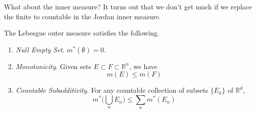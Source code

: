  What about the inner measure? It turns out that we don't get much if we replace the finite to countable in the Jordan inner measure. 

  \begin{lemma}
    The Lebesgue outer measure satisfies the following. 
    \begin{enumerate}
      \item \textit{Null Empty Set}. $m^\ast(\emptyset) = 0$. 
      \item \textit{Monotonicity}. Given sets $E \subset F \subset \mathbb{R}^n$, we have 
      \begin{equation}
        m(E) \leq m(F)
      \end{equation}
    \item \textit{Countable Subadditivity}. For any countable collection of subsets $\{E_k\}$ of $\mathbb{R}^d$, 
      \begin{equation}
        m^\ast \bigg( \bigcup_n E_n \bigg) \leq \sum_{n} m^\ast (E_n) 
      \end{equation}
    \end{enumerate}
  \end{lemma}
